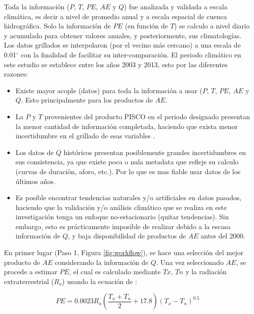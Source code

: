 \documentclass[12pt]{article}
\begin{document}


Toda la información ($P$, $T$, $PE$, $AE$ y $Q$) fue analizada y validada a escala climática, es decir a nivel de promedio anual y a escala espacial de cuenca hidrográfica. Solo la información de $PE$ (en función de $T$) se calculo a nivel diario y acumulado para obtener valores anuales, y posteriormente, sus climatologías. Los datos grillados se interpolaron (por el vecino más cercano) a una escala de 0.01$^{\circ}$ con la finalidad de facilitar su inter-comparación. El periodo climático en este estudio se establece entre los años 2003 y 2013, esto por las diferentes razones:

\begin{itemize}

	\item Existe mayor acople (datos) para toda la información a usar ($P$, $T$, $PE$, $AE$ y $Q$. Esto principalmente para los productos de $AE$.
	
	\item La $P$ y $T$ provenientes del producto PISCO en el periodo designado presentan la menor cantidad de información completada, haciendo que exista menor incertidumbre en el grillado de esas variables \citep{Huerta2019,Aybar2019}.
	
	\item Los datos de $Q$ históricos presentan posiblemente grandes incertidumbres en sus consistencia, ya que existe poca o nula metadata que refleje su calculo (curvas de duración, aforo, etc.). Por lo que es mas fiable usar datos de los últimos años.
	
	\item Es posible encontrar tendencias naturales y/o artificiales en datos pasados, haciendo que la validación y/o análisis climático que se realiza en este investigación tenga un enfoque no-estacionario (quitar tendencias). Sin embargo, esto es prácticamente imposible de realizar debido a la escasa información de $Q$, y baja disponibilidad de productos de $AE$ antes del 2000.
	
\end{itemize}

En primer lugar (Paso 1, Figura \ref{fig:workflow}), se hace una selección del mejor producto de $AE$ considerando la información de $Q$. Una vez seleccionado $AE$, se procede a estimar $PE$, el cual es calculado mediante $Tx$, $Tn$ y la radiación extraterrestrial ($R_{a}$) usando la ecuación de \citet{Hargreaves1985}:

\begin{equation}
PE = 0.0023R_{a}\left ( \frac{T_{x}+T_{n}}{2} + 17.8 \right )\left ( T_{x}-T_{n} \right )^{0.5}
\end{equation}
\end{document}
